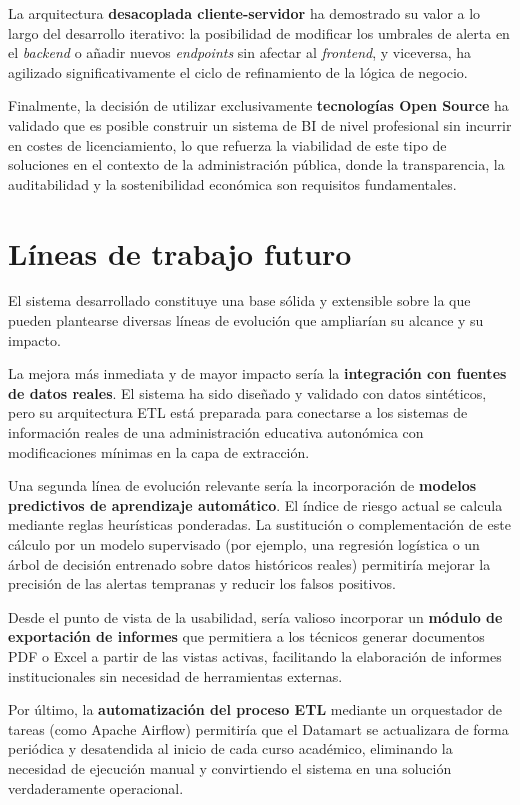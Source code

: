 La arquitectura \textbf{desacoplada cliente-servidor} ha demostrado su valor a lo largo del desarrollo iterativo: la posibilidad de modificar los umbrales de alerta en el \textit{backend} o añadir nuevos \textit{endpoints} sin afectar al \textit{frontend}, y viceversa, ha agilizado significativamente el ciclo de refinamiento de la lógica de negocio.

Finalmente, la decisión de utilizar exclusivamente \textbf{tecnologías Open Source} ha validado que es posible construir un sistema de BI de nivel profesional sin incurrir en costes de licenciamiento, lo que refuerza la viabilidad de este tipo de soluciones en el contexto de la administración pública, donde la transparencia, la auditabilidad y la sostenibilidad económica son requisitos fundamentales.

\section{Líneas de trabajo futuro}

El sistema desarrollado constituye una base sólida y extensible sobre la que pueden plantearse diversas líneas de evolución que ampliarían su alcance y su impacto.

La mejora más inmediata y de mayor impacto sería la \textbf{integración con fuentes de datos reales}. El sistema ha sido diseñado y validado con datos sintéticos, pero su arquitectura ETL está preparada para conectarse a los sistemas de información reales de una administración educativa autonómica con modificaciones mínimas en la capa de extracción.

Una segunda línea de evolución relevante sería la incorporación de \textbf{modelos predictivos de aprendizaje automático}. El índice de riesgo actual se calcula mediante reglas heurísticas ponderadas. La sustitución o complementación de este cálculo por un modelo supervisado (por ejemplo, una regresión logística o un árbol de decisión entrenado sobre datos históricos reales) permitiría mejorar la precisión de las alertas tempranas y reducir los falsos positivos.

Desde el punto de vista de la usabilidad, sería valioso incorporar un \textbf{módulo de exportación de informes} que permitiera a los técnicos generar documentos PDF o Excel a partir de las vistas activas, facilitando la elaboración de informes institucionales sin necesidad de herramientas externas.

Por último, la \textbf{automatización del proceso ETL} mediante un orquestador de tareas (como Apache Airflow) permitiría que el Datamart se actualizara de forma periódica y desatendida al inicio de cada curso académico, eliminando la necesidad de ejecución manual y convirtiendo el sistema en una solución verdaderamente operacional.
